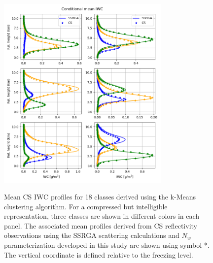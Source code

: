 \documentclass{ametsocV6.1}
\begin{document}
\begin{figure}[t]
    \centering
    \includegraphics[width=0.75\textwidth,angle=0]{fig01.png}\\
    \caption{Mean CS IWC profiles for 18 classes derived using the k-Means clustering algorithm. For a 
    compressed but intelligible representation, three classes are shown in different colors in each panel.
    The associated 
    mean profiles derived from CS reflectivity observations using the SSRGA scattering calculations 
    and $N_w$ parameterization developed in this study are shown using symbol *. The vertical coordinate 
    is defined relative to the freezing level.}\label{f1}
\end{figure}
\end{document}
